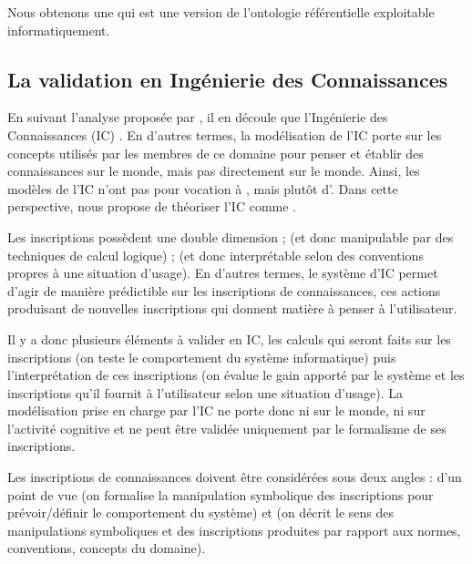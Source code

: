 Nous obtenons une  qui est une version de l'ontologie référentielle exploitable informatiquement.





\subsection{La validation en Ingénierie des Connaissances}\label{sec:valid-ic}
En suivant l'analyse proposée par \cite{Bachimont2004}, il en découle que  l'Ingénierie des Connaissances (IC) . 
En d'autres termes, la modélisation de l'IC porte sur les concepts utilisés par les membres de ce domaine pour penser et établir des connaissances sur le monde, mais pas directement sur le monde.
Ainsi, les modèles de l'IC n'ont pas pour vocation à , mais plutôt d'. 
Dans cette perspective, \citeauthor{Bachimont2004} nous propose de théoriser l'IC comme . 
        
Les inscriptions possèdent une double dimension ;  (et donc manipulable par des techniques de calcul logique) ;  (et donc interprétable selon des conventions propres à une situation d'usage).  
En d'autres termes, le système d'IC permet d'agir de manière prédictible sur les inscriptions de connaissances, ces actions produisant de nouvelles inscriptions qui donnent matière à penser à l'utilisateur. 
        
Il y a donc plusieurs éléments à valider en IC, les calculs qui seront faits sur les inscriptions (on teste le comportement du système informatique) puis l'interprétation de ces inscriptions (on évalue le gain apporté par le système et les inscriptions qu'il fournit à l'utilisateur selon une situation d'usage). 
La modélisation prise en charge par l'IC ne porte donc ni sur le monde, ni sur l'activité cognitive et ne peut être validée uniquement par le formalisme de ses inscriptions. 
        
Les inscriptions de connaissances doivent être considérées sous deux angles : d'un point de vue  (on formalise la manipulation symbolique des inscriptions pour prévoir/définir le comportement du système) et  (on décrit le sens des manipulations symboliques et des inscriptions produites par rapport aux normes, conventions, concepts du domaine).



